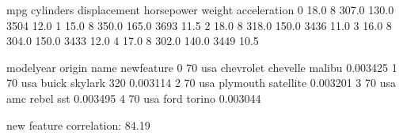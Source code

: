 \documentclass[letterpaper,10pt,english]{jupyterBook}
\begin{document}
\begin{sphinxVerbatim}[commandchars=\\\{\}]
\end{sphinxVerbatim}

\begin{sphinxVerbatim}[commandchars=\\\{\}]
    mpg  cylinders  displacement  horsepower  weight  acceleration  \PYGZbs{}
0  18.0          8         307.0       130.0    3504          12.0   
1  15.0          8         350.0       165.0    3693          11.5   
2  18.0          8         318.0       150.0    3436          11.0   
3  16.0          8         304.0       150.0    3433          12.0   
4  17.0          8         302.0       140.0    3449          10.5   

   model\PYGZus{}year origin                       name  new\PYGZus{}feature  
0          70    usa  chevrolet chevelle malibu     0.003425  
1          70    usa          buick skylark 320     0.003114  
2          70    usa         plymouth satellite     0.003201  
3          70    usa              amc rebel sst     0.003495  
4          70    usa                ford torino     0.003044  
\end{sphinxVerbatim}

\begin{sphinxVerbatim}[commandchars=\\\{\}]
\PYG{p}{[}\PYG{p}{]} \PYG{p}{[}\PYG{p}{]}
   \PYG{p}{[}\PYG{p}{]} \PYG{p}{[}\PYG{p}{]}
    
\end{sphinxVerbatim}

\begin{sphinxVerbatim}[commandchars=\\\{\}]
new feature correlation: 84.19\PYGZpc{}
\end{sphinxVerbatim}
\end{document}
